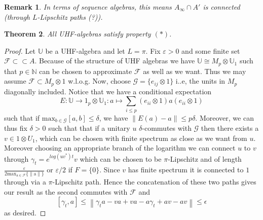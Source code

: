 \documentclass[11pt,a4paper,oneside]{amsart}
\newtheorem{theorem}{Theorem}[section]
\newtheorem{remark}[theorem]{Remark}
\newcommand{\norm}[1]{\left\|#1\right\|} %
\begin{document}
\begin{remark}
In terms of sequence algebras, this means $A_\infty\cap A'$ is connected (through $L$-Lipschitz paths (?)).
\end{remark}

\begin{theorem}
\label{UHF have (*)}
All UHF-algebras satisfy property $(*)$. 
\end{theorem}
\begin{proof}
Let $\mathbb U$ be a UHF-algebra and let $L=\pi$. Fix $\varepsilon>0$ and some finite set $\mathcal F\subset \subset A$. Because of the structure of UHF algebras we have $\mathbb U\cong M_p\otimes \mathbb U_1$ such that $p\in \mathbb N$ can be chosen to approximate $\mathcal F$ as well as we want. Thus we may assume $\mathcal F\subset M_p\otimes 1$ w.l.o.g. Now, choose $\mathcal G=\{e_{ij}\otimes 1\}$ i..e, the units in $M_p$ diagonally included. Notice that we have a conditional expectation $$E: \mathbb U\rightarrow 1_p\otimes \mathbb U_1: a\mapsto \sum_{i\leq p}(e_{ii}\otimes 1) a (e_{ii}\otimes 1)$$ such that if $ \mathrm{max}_{b\in \mathcal G}[a, b]\leq \delta$, we have $\norm{E(a)-a}\leq p\delta$. Moreover, we can thus fix $\delta>0$ such that that if a unitary $u$ $\delta$-commutes with $\mathcal G$ then there exists a $v\in 1\otimes U_1$, which can be chosen with finite spectrum as close as we want from $u$. Moreover choosing an appropriate branch of the logarithm we can connect $u$ to $v$ through $\gamma_t=e^{log(uv^*)t}v$ which can be chosen to be $\pi$-Lipschitz and of length $\frac{\varepsilon}{2 \mathrm{max_{a\in \mathcal F}\{\norm a\}}}$ or $\varepsilon/2$ if $F=\{0\}$. Since $v$ has finite spectrum it is connected to $1$ through via a $\pi$-Lipschitz path. Hence the concatenation of these two paths gives our result as the second commutes with $\mathcal F$ and $$[\gamma_t, a]\leq \norm{\gamma_t a- va + va - a\gamma_t+av -av}\leq \epsilon$$ as desired.
\end{proof}
\end{document}

